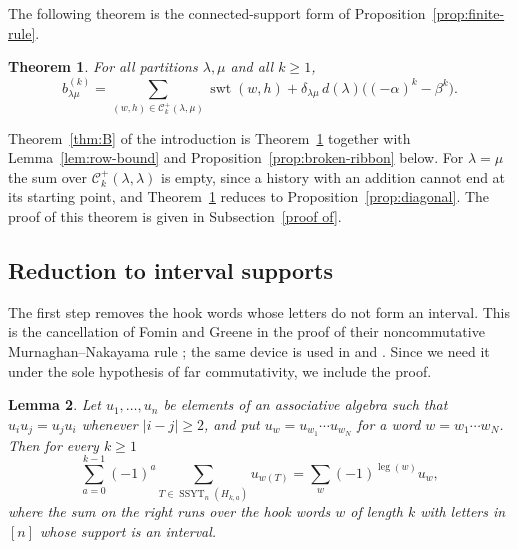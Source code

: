\documentclass[11pt]{amsart}
\numberwithin{equation}{section}
\newtheorem{theorem}{Theorem}[section]
\newtheorem{lemma}[theorem]{Lemma}
\theoremstyle{definition}
\theoremstyle{remark}
\newcommand{\SSYT}{\operatorname{SSYT}}
\newcommand{\swt}{\operatorname{swt}}
\newcommand{\leg}{\operatorname{leg}}
\newcommand{\cC}{\mathcal C}
\begin{document}
The following theorem is the connected-support form of
Proposition~\ref{prop:finite-rule}.

\begin{theorem}\label{thm:connected-rule}
For all partitions $\lambda,\mu$ and all $k\geq1$,
\[
 b^{(k)}_{\lambda\mu}
 =\sum_{(w,h)\in\cC^+_k(\lambda,\mu)}\swt(w,h)
 +\delta_{\lambda\mu}\,d(\lambda)\bigl((-\alpha)^k-\beta^k\bigr).
\]
\end{theorem}

Theorem~\ref{thm:B} of the introduction is
Theorem~\ref{thm:connected-rule} together with Lemma~\ref{lem:row-bound} and
Proposition~\ref{prop:broken-ribbon} below. For $\lambda=\mu$ the sum over
$\cC^+_k(\lambda,\lambda)$ is empty, since a history with an addition cannot
end at its starting point, and Theorem~\ref{thm:connected-rule} reduces to
Proposition~\ref{prop:diagonal}. The proof of this theorem is given in Subsection~\ref{proof of}.

\subsection{Reduction to interval supports}

The first step removes the hook words whose letters do not form an
interval. This is the cancellation of Fomin and Greene in the proof of
their noncommutative Murnaghan--Nakayama rule \cite[Thm.~1.3]{FominGreene};
the same device is used in \cite{BSZ} and \cite[Lemma~5.3]{NguyenKk}. Since
we need it under the sole hypothesis of far commutativity, we include the
proof.

\begin{lemma}\label{lem:FG}
Let $u_1,\dots,u_n$ be elements of an associative algebra such that
$u_iu_j=u_ju_i$ whenever $|i-j|\geq2$, and put $u_w=u_{w_1}\cdots u_{w_N}$
for a word $w=w_1\cdots w_N$. Then for every $k\geq1$
\[
 \sum_{a=0}^{k-1}(-1)^a\sum_{T\in\SSYT_n(H_{k,a})}u_{w(T)}
 =\sum_w(-1)^{\leg(w)}u_w ,
\]
where the sum on the right runs over the hook words $w$ of length $k$ with
letters in $[n]$ whose support is an interval.
\end{lemma}
\end{document}
